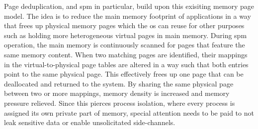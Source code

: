 Page deduplication, and \ac{spm} in particular, build upon this exisiting memory page model.
The idea is to reduce the main memory footprint of applications in a way that frees up physical memory pages which the \ac{os} can reuse for other purposes such as holding more heterogeneous virtual pages in main memory.
During \ac{spm} operation, the main memory is continuously scanned for pages that feature the same memory content.
When two matching pages are identified, their mappings in the virtual-to-physical page tables are altered in a way such that both entries point to the same physical page.
This effectively frees up one page that can be deallocated and returned to the system.
By sharing the same physical page between two or more mappings, memory density is increased and memory pressure relieved.
Since this pierces process isolation, where every process is assigned its own private part of memory, special attention needs to be paid to not leak sensitive data or enable unsolicitated side-channels.
